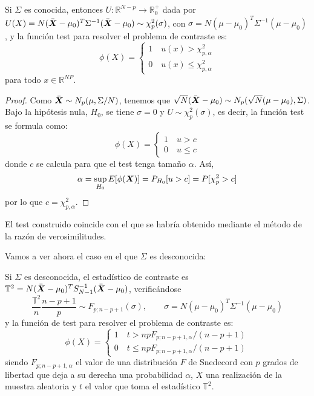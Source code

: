 \begin{nth}
  Si $\Sigma$ es conocida, entonces $U:\mathbb R^{N-p} \to \mathbb R^+_0$ dada por $U(X) = N(\bar{\boldsymbol{X}} - \mu_0)^T \Sigma^{-1} (\bar{\boldsymbol{X}} - \mu_0) \sim \chi_p^2(\sigma)$, con $\sigma = N(\mu - \mu_0)^T \Sigma^{-1}(\mu - \mu_0)$, y la función test para resolver el problema de contraste es:
  \[
  \phi(X) = \begin{cases}
           1 \quad u(x) > \chi^2_{p,\alpha} \\
           0 \quad u(x) \leq \chi^2_{p,\alpha}
            \end{cases}
  \]
  para todo $x\in \mathbb R^{NP}$.
\end{nth}
\begin{proof}
  Como $\bar{\boldsymbol{X}}\sim N_p(\mu,\Sigma/N)$, tenemos que $\sqrt{N}(\bar{\boldsymbol{X}} - \mu_0) \sim N_p(\sqrt{N}(\mu-\mu_0),\Sigma)$. Bajo la hipótesis nula, $H_0$, se tiene $\sigma = 0$ y $U\sim \chi_p^2(\sigma)$, es decir, la función test se formula como:
   \[
  \phi(X) = \begin{cases}
           1 \quad u > c \\
           0 \quad u \leq c
            \end{cases}
  \]
  donde $c$ se calcula para que el test tenga tamaño $\alpha$. Así,
  \[
\alpha = \sup_{H_0}E[\phi(\boldsymbol{X})] = P_{H_0}[u>c] = P[\chi_p^2 > c]
\]
por lo que $c = \chi^2_{p,\alpha}$.
\end{proof}
\begin{nota}
  El test construido coincide con el que se habría obtenido mediante el método de la razón de verosimilitudes.
\end{nota}
Vamos a ver ahora el caso en el que $\Sigma$ es desconocida:
\begin{nth}
  Si $\Sigma$ es desconocida, el estadístico de contraste es $ \mathbb T^2 = N(\bar{\boldsymbol{X}} -\mu_0)^TS_{N-1}^{-1}(\bar{\boldsymbol{X}} -\mu_0)$, verificándose
  \[
\frac{\mathbb T^2}{n}\frac{n-p+1}{p} \sim F_{p;n-p+1}(\sigma) , \qquad \sigma = N(\mu-\mu_0)^T \Sigma^{-1}(\mu - \mu_0)
\]
y la función de test para resolver el problema de contraste es:
\[
\phi(X) = \begin{cases}
  1 \quad t> npF_{p;n-p+1,\alpha}/(n-p+1)\\
  0 \quad t \leq npF_{p;n-p+1,\alpha}/(n-p+1)
\end{cases}
\]
siendo $F_{p;n-p+1,\alpha}$ el valor de una distribución $F$ de Snedecord con $p$ grados de libertad que deja a su derecha una probabilidad $\alpha$, $X$ una realización de la muestra aleatoria y $t$ el valor que toma el estadístico $\mathbb T^2$.
\end{nth}
